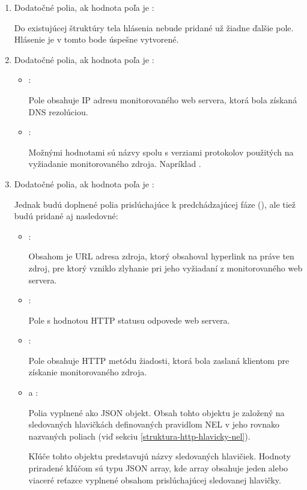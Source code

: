 \begin{enumerate}
    \item Dodatočné polia, ak hodnota poľa  je :

    Do existujúcej štruktúry tela hlásenia nebude pridané už žiadne ďalšie pole.
    Hlásenie je v tomto bode úspešne vytvorené.
    
    \item Dodatočné polia, ak hodnota poľa  je :
    \begin{itemize}
        \item {}:
    
        Pole obsahuje IP adresu monitorovaného web servera, ktorá bola získaná DNS rezolúciou.
        
        \item {}:
    
        Možnými hodnotami sú názvy spolu s verziami protokolov použitých na vyžiadanie monitorovaného zdroja.
        Napríklad .
    \end{itemize}
    
    \item Dodatočné polia, ak hodnota poľa  je :

    Jednak budú doplnené polia prislúchajúce k predchádzajúcej fáze (), ale tiež budú pridané aj nasledovné:
    \begin{itemize}
        \item {}:

        Obsahom je URL adresa zdroja, ktorý obsahoval hyperlink na práve ten zdroj, pre ktorý vzniklo zlyhanie pri jeho vyžiadaní z monitorovaného web servera.

        \item {}:

        Pole s hodnotou HTTP statusu odpovede web servera.

        \item {}:

        Pole obsahuje HTTP metódu žiadosti, ktorá bola zaslaná klientom pre získanie monitorovaného zdroja.
        
        \item {} a :
    
        Polia vyplnené ako JSON objekt. 
        Obsah tohto objektu je založený na sledovaných hlavičkách definovaných pravidlom NEL v jeho rovnako nazvaných poliach (viď sekciu \ref{struktura-http-hlavicky-nel}).
        
        Kľúče tohto objektu predstavujú názvy sledovaných hlavičiek.
        Hodnoty priradené kľúčom sú typu JSON array, kde array obsahuje jeden alebo viaceré reťazce vyplnené obsahom prislúchajúcej sledovanej hlavičky.
        
    \end{itemize}    
\end{enumerate}

